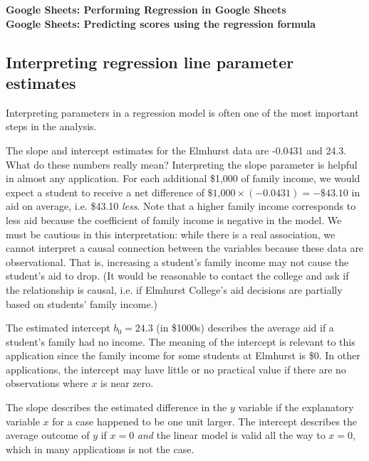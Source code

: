 \noindent\Large{\textbf{ {\color{ForestGreen} Google Sheets: Performing Regression in Google Sheets}}}
\normalsize \\

\noindent\Large{\textbf{ {\color{ForestGreen} Google Sheets: Predicting scores using the regression formula}}}
\normalsize


\textC{\newpage}


\subsection{Interpreting regression line parameter estimates}


Interpreting parameters in a regression model is often one of the most important steps in the analysis.

\begin{example}{The slope and intercept estimates for the Elmhurst data are -0.0431 and 24.3. What do these numbers really mean?}
Interpreting the slope parameter is helpful in almost any application. For each additional \$1,000 of family income, we would expect a student to receive a net difference of $\$\text{1,000}\times (-0.0431) = -\$43.10$ in aid on average, i.e. \$43.10 \emph{less}. Note that a higher family income corresponds to less aid because the coefficient of family income is negative in the model. We must be cautious in this interpretation: while there is a real association, we cannot interpret a causal connection between the variables because these data are observational. That is, increasing a student's family income may not cause the student's aid to drop. (It would be reasonable to contact the college and ask if the relationship is causal, i.e. if Elmhurst College's aid decisions are partially based on students' family income.)

The estimated intercept $b_0=24.3$ (in \$1000s) describes the average aid if a student's family had no income. The meaning of the intercept is relevant to this application since the family income for some students at Elmhurst is \$0. In other applications, the intercept may have little or no practical value if there are no observations where $x$ is near zero.
\end{example}

\begin{termBox}{
The slope describes the estimated difference in the $y$ variable if the explanatory variable $x$ for a case happened to be one unit larger. The intercept describes the average outcome of $y$ if $x=0$ \emph{and} the linear model is valid all the way to $x=0$, which in many applications is not the case.}
\end{termBox}

